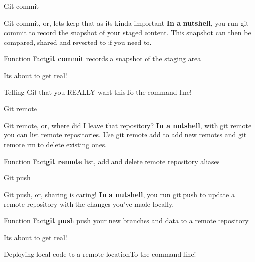 \documentclass{beamer}
\newcommand{\demo}[1]{\begin{frame}{Its about to get real!}\begin{exampleblock}{#1}To the command line!\end{exampleblock}\end{frame}}
\newcommand{\clfact}[2]{\begin{alertblock}{Function Fact}\textbf{#1} #2\end{alertblock}}
\begin{document}
\begin{frame}{Git commit}
    \begin{block}{Git commit, or, lets keep that as its kinda important}
    \textbf{In a nutshell}, you run git commit to record the snapshot of your staged content. This snapshot can then be compared, shared and reverted to if you need to.
    
    \end{block}
    \clfact{git commit}{records a snapshot of the staging area}
\end{frame}
\demo{Telling Git that you REALLY want this}

\begin{frame}{Git remote}
    \begin{block}{Git remote, or, where did I leave that repository?}
    \textbf{In a nutshell}, with git remote you can list remote repositories. Use git remote add to add new remotes and git remote rm to delete existing ones.
    
    \end{block}
    \clfact{git remote}{list, add and delete remote repository aliases}
\end{frame}

\begin{frame}{Git push}
    \begin{block}{Git push, or, sharing is caring!}
    \textbf{In a nutshell}, you run git push to update a remote repository with the changes you've made locally. 
    
    \end{block}
    \clfact{git push}{push your new branches and data to a remote repository}
\end{frame}
\demo{Deploying local code to a remote location}
\end{document}
